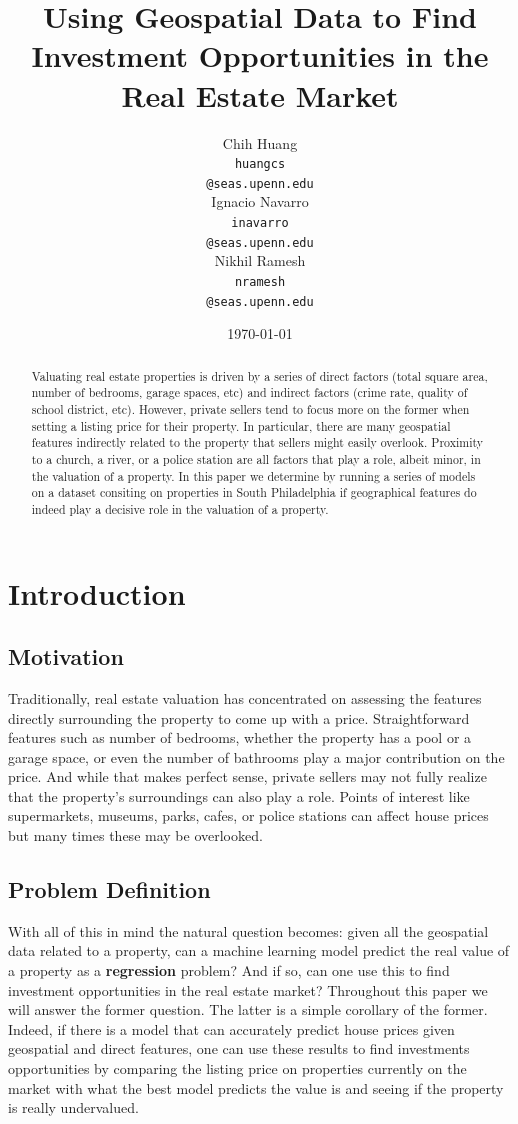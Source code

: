 \documentclass[11pt,a4paper]{article}
\title{Using Geospatial Data to Find Investment Opportunities in the Real Estate Market}
\author{Chih Huang \\
  {\tt huangcs} \\
  {\tt @seas.upenn.edu} \\\And
  Ignacio Navarro \\
  {\tt inavarro} \\
  {\tt @seas.upenn.edu} \\\And
  Nikhil Ramesh \\
  {\tt nramesh} \\
  {\tt @seas.upenn.edu}
}
\date{\today}
\begin{document}
\maketitle
\begin{abstract}
  Valuating real estate properties is driven by a series of direct 
  factors (total square area, number of bedrooms, garage spaces, etc) 
  and indirect factors (crime rate, quality of school district, etc). However, private sellers tend to focus more on the former when setting 
  a listing price for their property. In particular, there are many
  geospatial features indirectly related to the property that sellers
  might easily overlook. Proximity to a church, a river, or a police
  station are all factors that play a role, albeit minor, in the valuation
  of a property. In this paper we determine by running a series of models on a dataset consiting
  on properties in South Philadelphia if geographical features do indeed play a decisive role 
  in the valuation of a property. 
\end{abstract}

\section{Introduction}

\subsection{Motivation}

Traditionally, real estate valuation has concentrated on assessing the
features directly surrounding the property to come up with a price.
Straightforward features such as number of bedrooms, whether the property
has a pool or a garage space, or even the number of bathrooms play a major
contribution on the price. And while that makes perfect sense, private
sellers may not fully realize that the property's surroundings can also
play a role. Points of interest like supermarkets, museums, parks, cafes,
or police stations can affect house prices but many times these may be
overlooked. 

\subsection{Problem Definition}

With all of this in mind the natural question becomes: given all the 
geospatial data related to a property, can a machine learning model 
predict the real value of a property as a \textbf{regression} problem? 
And if so, can one use this to
find investment opportunities in the real estate market? Throughout
this paper we will answer the former question. The latter is a simple
corollary of the former. Indeed, if there is a model that can accurately 
predict house prices given geospatial and direct features, one can use these
results to find investments opportunities by comparing the listing
price on properties currently on the market with what the best model 
predicts the value is and seeing if the property is really undervalued.
\end{document}
